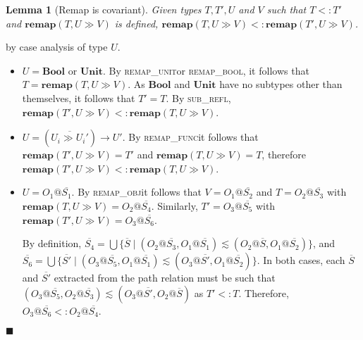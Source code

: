 \documentclass[preprint]{sigplanconf}
\makeatletter
\newtheorem{lem}{Lemma}
\newcommand{\subrefl}{\textsc{sub\_refl}}
\newcommand{\remapunit}{\textsc{remap\_unit}}
\newcommand{\remapbool}{\textsc{remap\_bool}}
\newcommand{\remapfunc}{\textsc{remap\_func}}
\newcommand{\remapobj}{\textsc{remap\_obj}}
\newcommand{\remapapp}[3]{\ensuremath{\mathbf{remap}(#1, #2 \gg #3)}}
\newcommand{\unitt}{\mathbf{Unit}}
\newcommand{\boolt}{\mathbf{Bool}}
\newcommand{\ot}[2]{#1@\overline{#2}}
\newcommand{\funt}[3]{(\overline{#1 \gg #2}) \rightarrow #3}
\newcommand{\qed}{$\blacksquare$}
\newenvironment{proof}{\vspace{1ex}\noindent{\bf Proof}\hspace{0.5em}}
  {\hfill\qed\vspace{1ex}}
\makeatother
\begin{document}

\begin{lem}[Remap is covariant]
\label{lem:remapcv}
Given types $T, T', U$ and $V$ such that $T <: T'$ and
$\remapapp{T}{U}{V}$ is defined,
$\remapapp{T}{U}{V} <: \remapapp{T'}{U}{V}$.
\end{lem}
\begin{proof}
by case analysis of type $U$.

\begin{itemize}
\item $U = \boolt$ or $\unitt$. By \remapunit or \remapbool, it follows
that $T = \remapapp{T}{U}{V}$. 
As $\boolt$ and $\unitt$ have no subtypes other than
themselves, it follows that $T' = T$. By \subrefl,
$\remapapp{T'}{U}{V} <: \remapapp{T}{U}{V}$.

\item $U = \funt{U_i}{U_i'}{U'}$. By \remapfunc it follows that
$\remapapp{T'}{U}{V} = T'$ and $\remapapp{T}{U}{V} = T$, therefore
$\remapapp{T'}{U}{V} <: \remapapp{T}{U}{V}$.

\item $U = \ot{O_1}{S_1}$. By \remapobj it follows that 
$V = \ot{O_1}{S_2}$ and
$T = \ot{O_2}{S_3}$ with
$\remapapp{T}{U}{V} = \ot{O_2}{S_4}$. Similarly,
$T' = \ot{O_3}{S_5}$
with $\remapapp{T'}{U}{V} = \ot{O_3}{S_6}$. 

By definition,
$\overline{S_4} = \bigcup \{ \overline{S} \mid (\ot{O_2}{S_3}, \ot{O_1}{S_1}) \lesssim (\ot{O_2}{S}, \ot{O_1}{S_2}) \}$, and
$\overline{S_6} = \bigcup \{ \overline{S'} \mid (\ot{O_3}{S_5}, \ot{O_1}{S_1}) \lesssim (\ot{O_3}{S'}, \ot{O_1}{S_2}) \}$.
In both cases, each $\overline{S}$ and $\overline{S'}$ extracted from
the path relation must be such that 
$(\ot{O_3}{S_5}, \ot{O_2}{S_3}) \lesssim (\ot{O_3}{S'}, \ot{O_2}{S})$
as $T' <: T$.
Therefore, $\ot{O_3}{S_6} <: \ot{O_2}{S_4}$.

\end{itemize}
\end{proof}

\end{document}
